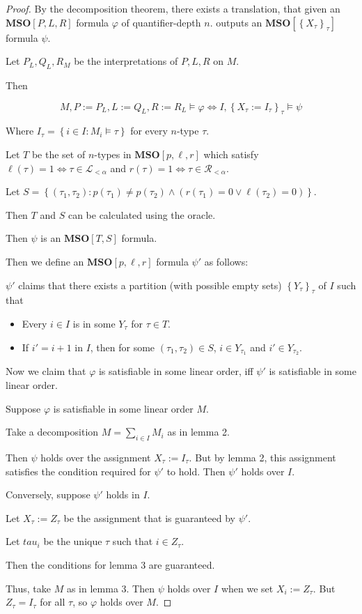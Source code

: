 \documentclass{article}
\newcommand{\braces}[1]{\left\{ {#1} \right\}}
\newcommand{\setcomp}[1]{\braces{#1}}
\newcommand{\mso}{\mathbf{MSO}}
\begin{document}
\begin{proof}
  By the decomposition theorem, there exists a translation,
  that given an $\mso[P, L, R]$ formula $\varphi$ of quantifier-depth $n$.
  outputs an $\mso[\setcomp{X_\tau}_\tau]$ formula $\psi$.

  Let $P_L, Q_L, R_M$ be the interpretations of $P, L, R$ on $M$.

  Then

  $$
    M, P := P_L, L := Q_L, R := R_L \models \varphi \iff I, \setcomp{X_\tau := I_\tau}_\tau \models \psi
  $$

  Where $I_\tau = \setcomp{i \in I : M_i \models \tau}$ for every $n$-type $\tau$.

  Let $T$ be the set of $n$-types in $\mso[p, \ell, r]$ which satisfy
  $\ell(\tau) = 1 \iff \tau \in \mathcal{L}_{< \alpha}$ and $r(\tau) = 1 \iff \tau \in \mathcal{R}_{< \alpha}$.

  Let $S = \setcomp{(\tau_1, \tau_2) : p(\tau_1) \ne p(\tau_2) \land (r(\tau_1) = 0 \lor \ell(\tau_2) = 0)}$.

  Then $T$ and $S$ can be calculated using the oracle.

  Then $\psi$ is an $\mso[T, S]$ formula.

  Then we define an $\mso[p, \ell, r]$ formula $\psi'$ as follows:

  $\psi'$ claims that there exists a partition (with possible empty sets) $\setcomp{Y_\tau}_{\tau}$ of $I$ such that
  \begin{itemize}
    \item Every $i \in I$ is in some $Y_\tau$ for $\tau \in T$.
    \item If $i' = i+1$ in $I$, then for some $(\tau_1, \tau_2) \in S$, $i \in Y_{\tau_1}$ and $i' \in Y_{\tau_2}$.
  \end{itemize}

  Now we claim that $\varphi$ is satisfiable in some linear order, iff $\psi'$ is satisfiable in some
  linear order.

  Suppose $\varphi$ is satisfiable in some linear order $M$.

  Take a decomposition $M = \sum_{i \in I} M_i$ as in lemma 2.

  Then $\psi$ holds over the assignment $X_\tau := I_\tau$. But by lemma 2, this assignment
  satisfies the condition required for $\psi'$ to hold. Then $\psi'$ holds over $I$.

  Conversely, suppose $\psi'$ holds in $I$.

  Let $X_\tau := Z_\tau$ be the assignment that is guaranteed by $\psi'$.

  Let $tau_i$ be the unique $\tau$ such that $i \in Z_\tau$.

  Then the conditions for lemma 3 are guaranteed.

  Thus, take $M$ as in lemma 3. Then $\psi$ holds over $I$ when we set $X_i := Z_\tau$.
  But $Z_\tau = I_\tau$ for all $\tau$, so $\varphi$ holds over $M$.
\end{proof}
\end{document}
